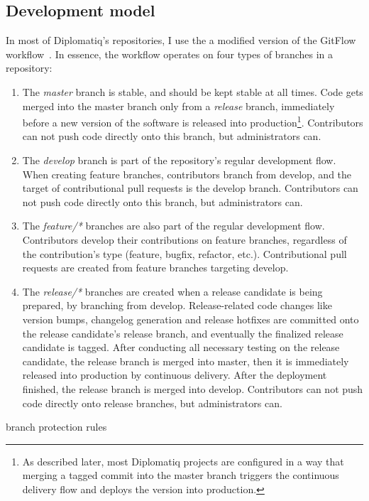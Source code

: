\subsection{Development model}

In most of Diplomatiq's repositories, I use the a modified version of the GitFlow workflow~\cite{gitflow}. In essence, the workflow operates on four types of branches in a repository:

\begin{enumerate}
\item The \emph{master} branch is stable, and should be kept stable at all times. Code gets merged into the master branch only from a \emph{release} branch, immediately before a new version of the software is released into production\footnote{As described later, most Diplomatiq projects are configured in a way that merging a tagged commit into the master branch triggers the continuous delivery flow and deploys the version into production.}. Contributors can not push code directly onto this branch, but administrators can.
\item The \emph{develop} branch is part of the repository's regular development flow. When creating feature branches, contributors branch from develop, and the target of contributional pull requests is the develop branch. Contributors can not push code directly onto this branch, but administrators can.
\item The \emph{feature/*} branches are also part of the regular development flow. Contributors develop their contributions on feature branches, regardless of the contribution's type (feature, bugfix, refactor, etc.). Contributional pull requests are created from feature branches targeting develop.
\item The \emph{release/*} branches are created when a release candidate is being prepared, by branching from develop. Release-related code changes like version bumps, changelog generation and release hotfixes are committed onto the release candidate's release branch, and eventually the finalized release candidate is tagged. After conducting all necessary testing on the release candidate, the release branch is merged into master, then it is immediately released into production by continuous delivery. After the deployment finished, the release branch is merged into develop. Contributors can not push code directly onto release branches, but administrators can.
\end{enumerate}

branch protection rules

